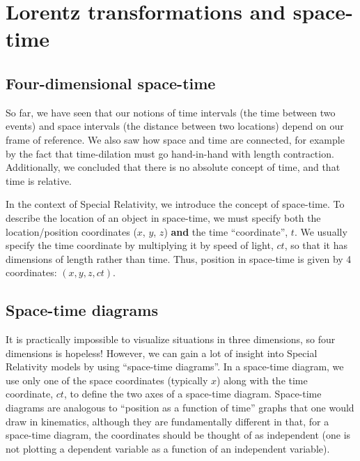 \section{Lorentz transformations and space-time}
\subsection{Four-dimensional space-time}
So far, we have seen that our notions of time intervals (the time between two events) and space intervals (the distance between two locations) depend on our frame of reference. We also saw how space and time are connected, for example by the fact that time-dilation must go hand-in-hand with length contraction. Additionally, we concluded that there is no absolute concept of time, and that time is relative. 

In the context of Special Relativity, we introduce the concept of space-time. To describe the location of an object in space-time, we must specify both the location/position coordinates ($x$, $y$, $z$) \textbf{and} the time ``coordinate'', $t$. We usually specify the time coordinate by multiplying it by speed of light, $ct$, so that it has dimensions of length rather than time. Thus, position in space-time is given by 4 coordinates: $(x,y,z,ct)$.

\subsection{Space-time diagrams}
It is practically impossible to visualize situations in three dimensions, so four dimensions is hopeless! However, we can gain a lot of insight into Special Relativity models by using ``space-time diagrams''. In a space-time diagram, we use only one of the space coordinates (typically $x$) along with the time coordinate, $ct$, to define the two axes of a space-time diagram. Space-time diagrams are analogous to ``position as a function of time'' graphs that one would draw in kinematics, although they are fundamentally different in that, for a space-time diagram, the coordinates should be thought of as independent (one is not plotting a dependent variable as a function of an independent variable).

